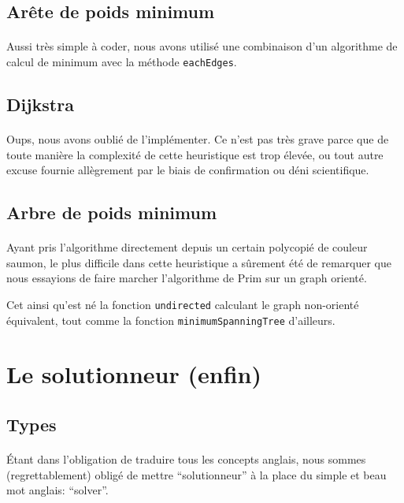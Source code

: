 \documentclass[french]{article}
\begin{document}
\subsection{Arête de poids minimum}

\paragraph{} Aussi très simple à coder, nous avons utilisé une combinaison d'un
algorithme de calcul de minimum avec la méthode \texttt{eachEdges}.

\subsection{Dijkstra}

\paragraph{} Oups, nous avons oublié de l'implémenter. Ce n'est pas très grave
parce que de toute manière la complexité de cette heuristique est trop élevée,
ou tout autre excuse fournie allègrement par le biais de confirmation ou déni
scientifique.

\subsection{Arbre de poids minimum}

\paragraph{} Ayant pris l'algorithme directement depuis un certain polycopié de
couleur saumon, le plus difficile dans cette heuristique a sûrement été de
remarquer que nous essayions de faire marcher l'algorithme de Prim sur un graph
orienté.

Cet ainsi qu'est né la fonction \texttt{undirected} calculant le graph
non-orienté équivalent, tout comme la fonction \texttt{minimumSpanningTree}
d'ailleurs.

\section{Le solutionneur (enfin)}

\subsection{Types}

\paragraph{} Étant dans l'obligation de traduire tous les concepts anglais,
nous sommes (regrettablement) obligé de mettre ``solutionneur'' à la place du
simple et beau mot anglais: ``solver''.
\end{document}
